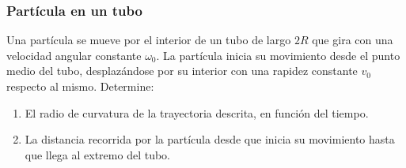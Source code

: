 \subsubsection{Partícula en un tubo}

Una partícula se mueve por el interior de un tubo de largo $2R$ que gira con una velocidad angular constante $\omega_0$. La partícula inicia su movimiento desde el punto medio del tubo, desplazándose por su interior con una rapidez constante $v_0$ respecto al mismo. Determine:

\begin{enumerate}
    \item El radio de curvatura de la trayectoria descrita, en función del tiempo.
    \item La distancia recorrida por la partícula desde que inicia su movimiento hasta que llega al extremo del tubo.
\end{enumerate}

